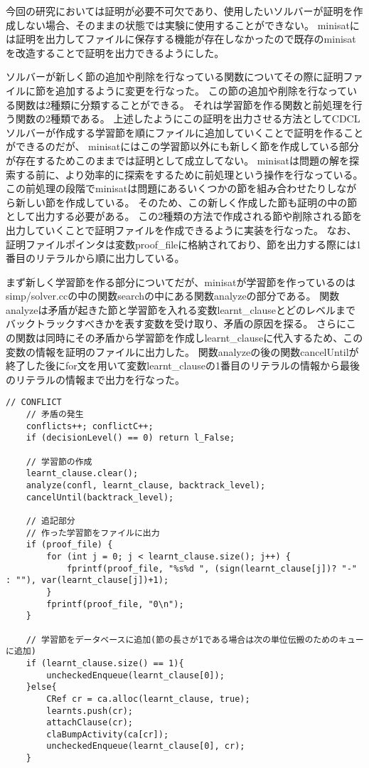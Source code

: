 


今回の研究においては証明が必要不可欠であり、使用したいソルバーが証明を作成しない場合、そのままの状態では実験に使用することができない。
minisatには証明を出力してファイルに保存する機能が存在しなかったので既存のminisatを改造することで証明を出力できるようにした。

ソルバーが新しく節の追加や削除を行なっている関数についてその際に証明ファイルに節を追加するように変更を行なった。
この節の追加や削除を行なっている関数は2種類に分類することができる。
それは学習節を作る関数と前処理を行う関数の2種類である。
上述したようにこの証明を出力させる方法としてCDCLソルバーが作成する学習節を順にファイルに追加していくことで証明を作ることができるのだが、
minisatにはこの学習節以外にも新しく節を作成している部分が存在するためこのままでは証明として成立してない。
minisatは問題の解を探索する前に、より効率的に探索をするために前処理という操作を行なっている。
この前処理の段階でminisatは問題にあるいくつかの節を組み合わせたりしながら新しい節を作成している。
そのため、この新しく作成した節も証明の中の節として出力する必要がある。
この2種類の方法で作成される節や削除される節を出力していくことで証明ファイルを作成できるように実装を行なった。
なお、証明ファイルポインタは変数proof\_fileに格納されており、節を出力する際には1番目のリテラルから順に出力している。

まず新しく学習節を作る部分についてだが、minisatが学習節を作っているのはsimp/solver.ccの中の関数searchの中にある関数analyzeの部分である。
関数analyzeは矛盾が起きた節と学習節を入れる変数learnt\_clauseとどのレベルまでバックトラックすべきかを表す変数を受け取り、矛盾の原因を探る。
さらにこの関数は同時にその矛盾から学習節を作成しlearnt\_clauseに代入するため、この変数の情報を証明のファイルに出力した。
関数analyzeの後の関数cancelUntilが終了した後にfor文を用いて変数learnt\_clauseの1番目のリテラルの情報から最後のリテラルの情報まで出力を行なった。
\begin{lstlisting}[caption=関数analyzeの変更(core/solver.cc), firstnumber=296]
	// CONFLICT
	// 矛盾の発生
    conflicts++; conflictC++;
    if (decisionLevel() == 0) return l_False;

	// 学習節の作成
    learnt_clause.clear();
    analyze(confl, learnt_clause, backtrack_level);
    cancelUntil(backtrack_level);
    
	// 追記部分
	// 作った学習節をファイルに出力
    if (proof_file) {
        for (int j = 0; j < learnt_clause.size(); j++) {
			fprintf(proof_file, "%s%d ", (sign(learnt_clause[j])? "-" : ""), var(learnt_clause[j])+1); 
        }
        fprintf(proof_file, "0\n");
    }

	// 学習節をデータベースに追加(節の長さが1である場合は次の単位伝搬のためのキューに追加)
	if (learnt_clause.size() == 1){
        uncheckedEnqueue(learnt_clause[0]);
    }else{
        CRef cr = ca.alloc(learnt_clause, true);
        learnts.push(cr);
        attachClause(cr);
        claBumpActivity(ca[cr]);
        uncheckedEnqueue(learnt_clause[0], cr);
    }
\end{lstlisting}

